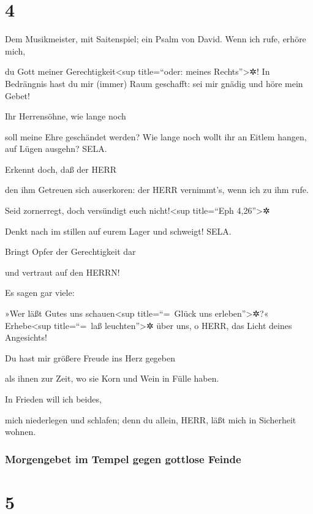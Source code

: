 \hypertarget{section-3}{%
\section{4}\label{section-3}}

Dem Musikmeister, mit Saitenspiel; ein Psalm von David.
Wenn ich rufe, erhöre mich,

du Gott meiner Gerechtigkeit\textless sup title=``oder: meines
Rechts''\textgreater✲! In Bedrängnis hast du mir (immer) Raum geschafft:
sei mir gnädig und höre mein Gebet!

Ihr Herrensöhne, wie lange noch

soll meine Ehre geschändet werden? Wie lange noch wollt ihr an Eitlem
hangen, auf Lügen ausgehn? SELA.

Erkennt doch, daß der HERR

den ihm Getreuen sich auserkoren: der HERR vernimmt's, wenn ich zu ihm
rufe.

Seid zornerregt, doch versündigt euch nicht!\textless sup
title=``Eph 4,26''\textgreater✲

Denkt nach im stillen auf eurem Lager und schweigt! SELA.

Bringt Opfer der Gerechtigkeit dar

und vertraut auf den HERRN!

Es sagen gar viele:

»Wer läßt Gutes uns schauen\textless sup title=``=~Glück uns
erleben''\textgreater✲?« Erhebe\textless sup title=``=~laß
leuchten''\textgreater✲ über uns, o HERR, das Licht deines Angesichts!

Du hast mir größere Freude ins Herz gegeben

als ihnen zur Zeit, wo sie Korn und Wein in Fülle haben.

In Frieden will ich beides,

mich niederlegen und schlafen; denn du allein, HERR, läßt mich in
Sicherheit wohnen.

\hypertarget{morgengebet-im-tempel-gegen-gottlose-feinde}{%
\subsubsection{Morgengebet im Tempel gegen gottlose
Feinde}\label{morgengebet-im-tempel-gegen-gottlose-feinde}}

\hypertarget{section-4}{%
\section{5}\label{section-4}}

